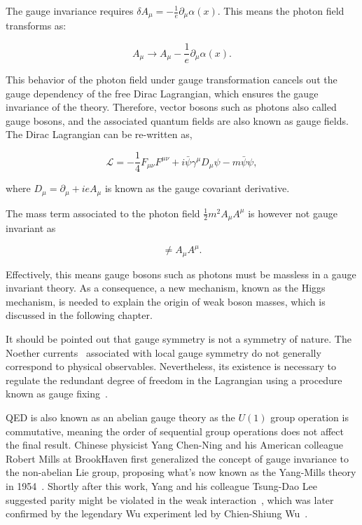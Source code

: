 The gauge invariance requires $\delta A_{\mu}=-\frac{1}{e}\partial_{\mu}\alpha(x)$. This means the photon field transforms as:

\begin{equation}
A_{\mu}\rightarrow A_{\mu}-\frac{1}{e}\partial_{\mu}\alpha(x).
\end{equation}

This behavior of the photon field under gauge transformation cancels out the gauge dependency of the free Dirac Lagrangian, which ensures the gauge invariance of the theory. Therefore, vector bosons such as photons also called gauge bosons, and the associated quantum fields are also known as gauge fields. The Dirac Lagrangian can be re-written as,

\begin{equation}
\label{eq:QEDCov}
\mathcal{L}=-\frac{1}{4}F_{\mu\nu}F^{\mu\nu}+i\bar{\psi}\gamma^{\mu}D_{\mu}\psi-m\bar{\psi}\psi,
\end{equation}

where $D_{\mu}=\partial_{\mu}+ieA_{\mu}$ is known as the gauge covariant derivative. 

The mass term associated to the photon field $\frac{1}{2}m^2A_{\mu}A^{\mu}$ is however not gauge invariant as

\begin{equation}
[A_{\mu}-\frac{1}{e}\partial_{\mu}\alpha(x)][A^{\mu}-\frac{1}{e}\partial^{\mu}\alpha(x)]\neq A_{\mu}A^{\mu}.
\end{equation}

Effectively, this means gauge bosons such as photons must be massless in a gauge invariant theory. As a consequence, a new mechanism, known as the Higgs mechanism, is needed to explain the origin of weak boson masses, which is discussed in the following chapter. 

It should be pointed out that gauge symmetry is not a symmetry of nature. The Noether currents~\cite{Noether1918} associated with local gauge symmetry do not generally correspond to physical observables. Nevertheless, its existence is necessary to regulate the redundant degree of freedom in the Lagrangian using a procedure known as gauge fixing~\cite{SCHWARTZ}. 

\ac{QED} is also known as an abelian gauge theory as the $U(1)$ group operation is commutative, meaning the order of sequential group operations does not affect the final result. Chinese physicist Yang Chen-Ning and his American colleague Robert Mills at BrookHaven first generalized the concept of gauge invariance to the non-abelian Lie group, proposing what's now known as the Yang-Mills theory in 1954~\cite{Yang:1954ek}. Shortly after this work, Yang and his colleague Tsung-Dao Lee suggested parity might be violated in the weak interaction~\cite{Lee:1956qn}, which was later confirmed by the legendary Wu experiment led by Chien-Shiung Wu~\cite{Wu:1957my}. 

